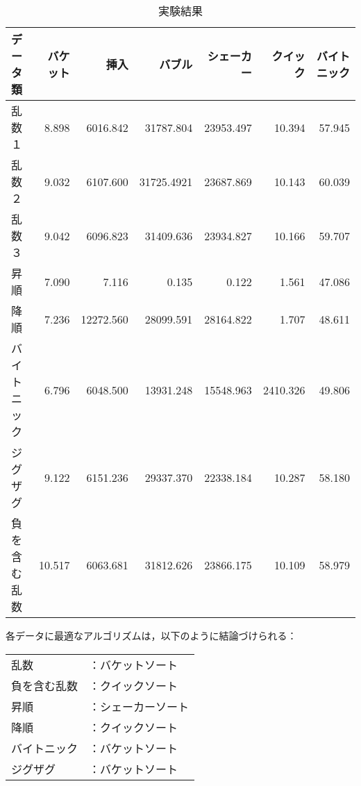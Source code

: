 \documentclass[a4j, titlepage]{jarticle}
\begin{document}
    \begin{table}[h!]
        \caption{実験結果}
        \label{tab:result}
        \begin{flushleft}
            \begin{tabular}{|l|r|r|r|r|r|r|}
                \hline
                データ類   & バケット & 挿入 & バブル & シェーカー & クイック & バイトニック \\ \hline
                乱数１     & \cellcolor{green!20}8.898 & 6016.842 & 31787.804 & 23953.497 & 10.394 & 57.945 \\ \hline
                乱数２     & \cellcolor{green!20}9.032 & 6107.600 & 31725.4921 & 23687.869 & 10.143 & 60.039 \\ \hline
                乱数３     & \cellcolor{green!20}9.042 & 6096.823 & 31409.636 & 23934.827 & 10.166 & 59.707 \\ \hline
                昇順       & 7.090 & 7.116 & 0.135 &  \cellcolor{green!20}0.122 & 1.561 & 47.086 \\ \hline
                降順       & 7.236 & 12272.560 & 28099.591 & 28164.822 &  \cellcolor{green!20}1.707 & 48.611 \\ \hline
                バイトニック& \cellcolor{green!20}6.796 & 6048.500 & 13931.248 & 15548.963 & 2410.326 & 49.806 \\ \hline
                ジグザグ   & \cellcolor{green!20}9.122 & 6151.236 & 29337.370 & 22338.184 & 10.287 & 58.180 \\ \hline
                負を含む乱数& 10.517 & 6063.681 & 31812.626 & 23866.175 &  \cellcolor{green!20}10.109 & 58.979 \\ \hline
            \end{tabular}
        \end{flushleft}
    \end{table}

    \vspace{150pt}
    
    各データに最適なアルゴリズムは，以下のように結論づけられる：
    \begin{shadebox}
        \begin{tabular}{ll}
            乱数 &：バケットソート\\
            負を含む乱数 &：クイックソート\\
            昇順 &：シェーカーソート\\
            降順 &：クイックソート\\
            バイトニック &：バケットソート\\
            ジグザグ &：バケットソート\\
        \end{tabular}
    \end{shadebox}
    
\end{document}
